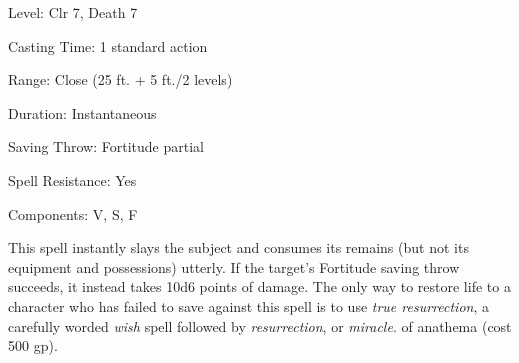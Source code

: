 
\begin{description*}
\item[Level:] Clr 7, Death 7
\item[Casting Time:] 1 standard action
\item[Range:] Close (25 ft. + 5 ft./2 levels)
\item[Duration:] Instantaneous
\item[Saving Throw:] Fortitude partial
\item[Spell Resistance:] Yes
\item[Components:] V, S, F
\end{description*}

This spell instantly slays the subject and consumes its remains (but not its equipment
and possessions) utterly. If the target's Fortitude saving throw succeeds, it instead
takes 10d6 points of damage. The only way to restore life to a character who has
failed to save against this spell is to use \textit{true resurrection}, a carefully
worded \textit{wish} spell followed by \textit{resurrection}, or \textit{miracle}.
of anathema (cost 500 gp).